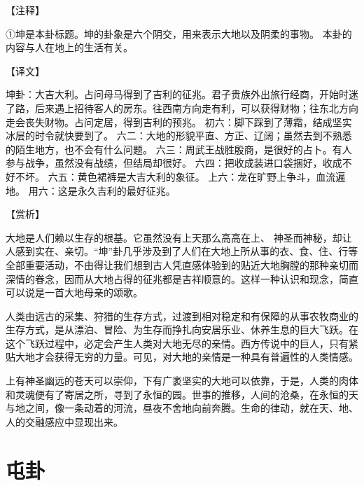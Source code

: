 \documentclass[12pt,UTF8]{ctexbook}
\begin{document}
【注释】

①坤是本卦标题。坤的卦象是六个阴交，用来表示大地以及阴柔的事物。 本卦的内容与人在地上的生活有关。


【译文】

坤卦：大吉大利。占问母马得到了吉利的征兆。君子贵族外出旅行经商，开始时迷了路，后来遇上招待客人的房东。往西南方向走有利，可以获得财物；往东北方向走会丧失财物。占问定居，得到吉利的预兆。
初六：脚下踩到了薄霜，结成坚实冰层的时令就快要到了。
六二：大地的形貌平直、方正、辽阔；虽然去到不熟悉的陌生地方，也不会有什么问题。
六三：周武王战胜殷商，是很好的占卜。有人参与战争，虽然没有战绩，但结局却很好。
六四：把收成装进口袋捆好，收成不好不坏。
六五：黄色裙裤是大吉大利的象征。
上六：龙在旷野上争斗，血流遍地。
用六：这是永久吉利的最好征兆。

【赏析】

大地是人们赖以生存的根基。它虽然没有上天那么高高在上、 神圣而神秘，却让人感到实在、亲切。“坤”卦几乎涉及到了人们在大地上所从事的衣、食、住、行等全部重要活动，不由得让我们想到古人凭直感体验到的贴近大地胸膛的那种亲切而深情的眷念，因而从大地占得的征兆都是吉祥顺意的。这样一种认识和现念，简直可以说是一首大地母亲的颂歌。

人类由远古的采集、狩猎的生存方式，过渡到相对稳定和有保障的从事农牧商业的生存方式，是从漂泊、冒险、为生存而挣扎向安居乐业、休养生息的巨大飞跃。在这个飞跃过程中，必定会产生人类对大地无尽的亲情。西方传说中的巨人，只有紧贴大地才会获得无穷的力量。可见，对大地的亲情是一种具有普遍性的人类情感。

上有神圣幽远的苍天可以崇仰，下有广袤坚实的大地可以依靠，于是，人类的肉体和灵魂便有了寄居之所，寻到了永恒的园。世事的推移，人间的沧桑，在永恒的天与地之间，像一条动着的河流，昼夜不舍地向前奔腾。生命的律动，就在天、地、人的交融感应中显现出来。

\chapter{屯卦}
\end{document}
